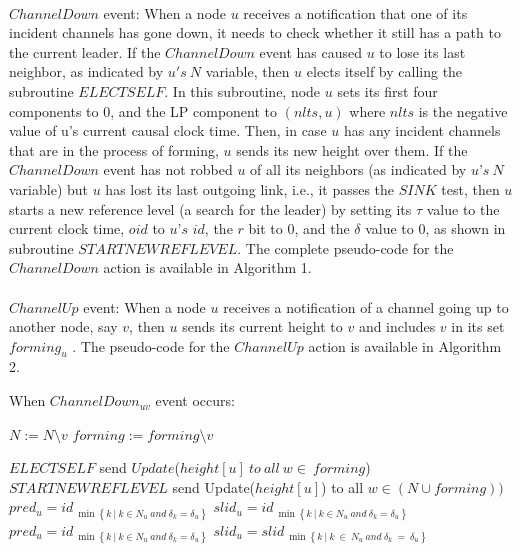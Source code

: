 \paragraph{}$ChannelDown$ event: When a node $u$ receives a notification that one of its incident channels has gone down, it needs to check whether it still has a path to the current leader. If the $ChannelDown$ event has caused $u$ to lose its last neighbor, as indicated by $u's~N$ variable, then $u$ elects itself by calling the subroutine $ELECTSELF$. In this subroutine, node $u$ sets its first four components to 0, and the LP component to $(nlts,u)$ where $nlts$ is the negative value of u’s current causal clock time. Then, in case $u$ has any incident channels that are in the process of forming, $u$ sends its new height over them. If the $ChannelDown$ event has not robbed $u$ of all its neighbors (as indicated by $u’s~N$ variable) but $u$ has lost its last outgoing link, i.e., it passes the $SINK$ test, then $u$ starts a new reference level (a search for the leader) by setting its $\tau$ value to the current clock time, $oid$ to $u’s$ $id$, the $r$ bit to $0$, and the $\delta$ value to $0$, as shown in subroutine $STARTNEWREFLEVEL$. The complete pseudo-code for the $ChannelDown$ action is available in Algorithm 1.

\paragraph{}$ChannelUp$ event: When a node $u$ receives a notification of a channel going up to another node, say $v$, then $u$ sends its current height to $v$ and includes $v$ in its set $forming_u$ . The pseudo-code for the $ChannelUp$ action is available in Algorithm 2.

\begin{algorithm}
	\caption{When $ChannelDown_{uv}$ event occurs:}
	\begin{algorithmic}[1]
		
		\State $N := N \setminus {v}$
		\State $forming := forming \setminus {v}$
		
		\State $ELECTSELF$
		\State send $Update$($height[u]~to~all~w\in ~forming$)
		\State $STARTNEWREFLEVEL$
		\State send Update($height[u]$) to all $w \in (N \cup forming))$
		\State $pred_u = id_{~\min \left\lbrace  k~|~k \in N_u~and~\delta _k = \delta _u \right\rbrace}$
		\State $slid_u = id_{~\min \left\lbrace  k~|~k \in N_u~and~\delta _k = \delta _u \right\rbrace}$
		\State $pred_u = id_{~\min \left\lbrace  k~|~k \in N_u~and~\delta _k = \delta _u \right\rbrace  }$
		\State $slid_u = slid_{~\min \left\lbrace  k~|~k~\in~ N_u~and~\delta _k~=~\delta _u \right\rbrace}$
		\EndIf
		
		
	\end{algorithmic}

\end{algorithm}

